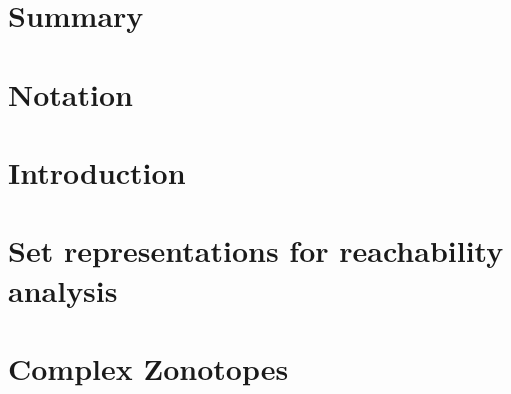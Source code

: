 \documentclass[11pt,a4paper,twoside,openright]{book}
\begin{document}
\pagestyle{empty}


\frontmatter
\pagestyle{plain}

% 
% 
% 
\chapter{Summary} 
% 
% 
\cleardoublepage
{}
\tableofcontents
\listofalgorithms

\chapter*{Notation} 

\mainmatter 
\pagestyle{fancy}

\chapter{Introduction} \label{ch:intro} 
%
\chapter{Set representations for reachability analysis} \label{ch:review} 
% 
\chapter{Complex Zonotopes} \label{ch:tcz} 
%
\end{document}
